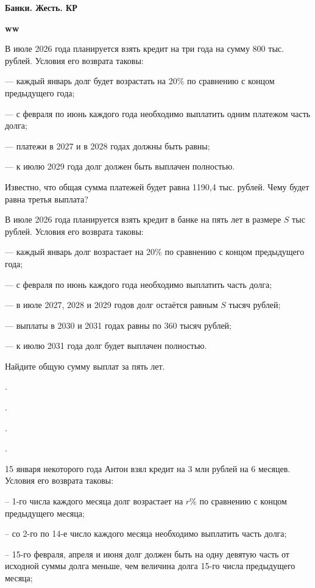 \centerline{\bf \Huge Банки. Жесть. КР}
\centerline{\bf \Huge }

\begin{flushright}
        \scriptsize{\textbf{ww}}
\end{flushright}

 В июле 2026 года планируется взять кредит на три года на сумму 800 тыс. рублей. Условия его возврата таковы:

— каждый январь долг будет возрастать на 20\% по сравнению с концом предыдущего года;

— с февраля по июнь каждого года необходимо выплатить одним платежом часть долга;

— платежи в 2027 и в 2028 годах должны быть равны;

— к июлю 2029 года долг должен быть выплачен полностью.

Известно, что общая сумма платежей будет равна 1190,4 тыс. рублей. Чему будет равна
третья выплата?

 В июле 2026 года планируется взять кредит в банке на пять лет в размере $S$ тыс рублей.
Условия его возврата таковы:

— каждый январь долг возрастает на 20\% по сравнению с концом предыдущего года;

— с февраля по июнь каждого года необходимо выплатить часть долга;

— в июле 2027, 2028 и 2029 годов долг остаётся равным $S$ тысяч рублей;

— выплаты в 2030 и 2031 годах равны по 360 тысяч рублей;

— к июлю 2031 года долг будет выплачен полностью.

Найдите общую сумму выплат за пять лет.

.

.

.

.

 15 января некоторого года Антон взял кредит на 3 млн рублей на 6 месяцев. Условия его возврата таковы:

– 1-го числа каждого месяца долг возрастает на $r$\% по сравнению с концом предыдущего
месяца;

– со 2-го по 14-е число каждого месяца необходимо выплатить часть долга;

– 15-го февраля, апреля и июня долг должен быть на одну девятую часть от исходной суммы
долга меньше, чем величина долга 15-го числа предыдущего месяца;

